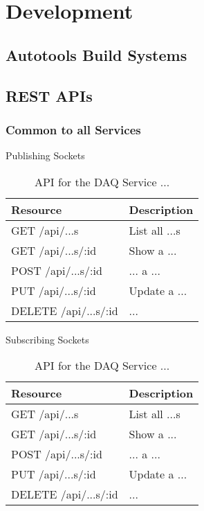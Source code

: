\section{Development}\label{sec:dev}

  \subsection{Autotools Build Systems}\label{sec:dev-ac}

  \subsection{REST APIs}\label{sec:rest}

    \subsubsection{Common to all Services}\label{sec:rest-common}

      \large{Publishing Sockets}

      \begin{table}[H]
        \centering
        \begin{tabular}{p{6cm} p{10cm}}
          \toprule
          \textbf{Resource} & \textbf{Description} \\ [0.5ex]
          \midrule
          GET /api/...s & List all ...s \\
          GET /api/...s/:id & Show a ... \\
          POST /api/...s/:id & ... a ... \\
          PUT /api/...s/:id & Update a ... \\
          DELETE /api/...s/:id & ... \\
          \bottomrule
        \end{tabular}
        \caption{API for the DAQ Service ...}\label{tab:rest-daq-...}
      \end{table}

      \large{Subscribing Sockets}

      \begin{table}[H]
        \centering
        \begin{tabular}{p{6cm} p{10cm}}
          \toprule
          \textbf{Resource} & \textbf{Description} \\ [0.5ex]
          \midrule
          GET /api/...s & List all ...s \\
          GET /api/...s/:id & Show a ... \\
          POST /api/...s/:id & ... a ... \\
          PUT /api/...s/:id & Update a ... \\
          DELETE /api/...s/:id & ... \\
          \bottomrule
        \end{tabular}
        \caption{API for the DAQ Service ...}\label{tab:rest-daq-...}
      \end{table}

